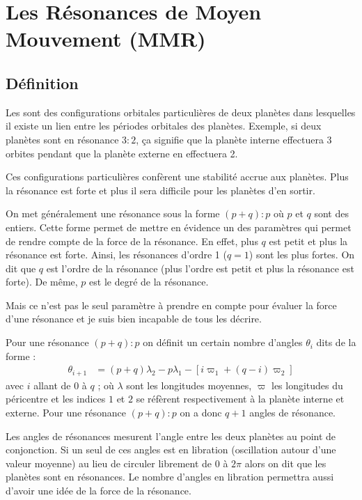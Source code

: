 \section{Les Résonances de Moyen Mouvement (MMR)}
\subsection{Définition}
Les  sont des configurations orbitales particulières de deux planètes dans lesquelles il existe un lien entre les périodes orbitales des planètes. Exemple, si deux planètes sont en résonance $3:2$, ça signifie que la planète interne effectuera 3 orbites pendant que la planète externe en effectuera 2.

Ces configurations particulières confèrent une stabilité accrue aux planètes. Plus la résonance est forte et plus il sera difficile pour les planètes d'en sortir.

\bigskip

On met généralement une résonance sous la forme $(p+q):p$ où $p$ et $q$ sont des entiers. Cette forme permet de mettre en évidence un des paramètres qui permet de rendre compte de la force de la résonance. En effet, plus $q$ est petit et plus la résonance est forte. Ainsi, les résonances d'ordre 1 ($q=1$) sont les plus fortes. On dit que $q$ est l'ordre de la résonance (plus l'ordre est petit et plus la résonance est forte). De même, $p$ est le degré de la résonance.

\begin{attention}
Mais ce n'est pas le seul paramètre à prendre en compte pour évaluer la force d'une résonance et je suis bien incapable de tous les décrire.
\end{attention}

Pour une résonance $(p+q):p$ on définit un certain nombre d'angles $\theta_i$ dits  de la forme :
\begin{align}
\theta_{i+1} &=(p+q)\lambda_2 -p\lambda_1 - \left[i\varpi_{1} + (q-i)\varpi_2\right]
\end{align}
avec $i$ allant de $0$ à $q$ ; où $\lambda$ sont les longitudes moyennes, $\varpi$ les longitudes du péricentre et les indices $1$ et $2$ se réfèrent respectivement à la planète interne et externe. Pour une résonance $(p+q):p$ on a donc $q+1$ angles de résonance.

Les angles de résonances mesurent l'angle entre les deux planètes au point de conjonction. Si un seul de ces angles est en libration (oscillation autour d'une valeur moyenne) au lieu de circuler librement de $0$ à $2\pi$ alors on dit que les planètes sont en résonances. Le nombre d'angles en libration permettra aussi d'avoir une idée de la force de la résonance.

